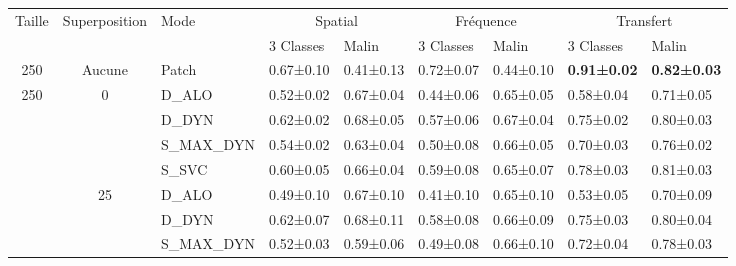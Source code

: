 \begin{landscape}

\begin{table}[H]
    \centering
    \begin{tabular}{cclllllll}
		\toprule
		\multirow{2}{*}{Taille}     & \multirow{2}{*}{Superposition}    & \multirow{2}{*}{Mode}     & \multicolumn{2}{c}{Spatial}       & \multicolumn{2}{c}{Fréquence}     & \multicolumn{2}{c}{Transfert}         \\
		                            &                                   &                           & 3 Classes         & Malin         & 3 Classes         & Malin         & 3 Classes         & Malin             \\ \midrule
		250                         & Aucune                            & Patch                     & 0.67±0.10         & 0.41±0.13     & 0.72±0.07         & 0.44±0.10     & \textbf{0.91±0.02}& \textbf{0.82±0.03}\\ \midrule
		\multirow{12}{*}{250}       & \multirow{4}{*}{0}                & D\_ALO                    & 0.52±0.02         & 0.67±0.04     & 0.44±0.06         & 0.65±0.05     & 0.58±0.04         & 0.71±0.05         \\ 
							        &                                   & D\_DYN                    & 0.62±0.02         & 0.68±0.05     & 0.57±0.06         & 0.67±0.04     & 0.75±0.02         & 0.80±0.03         \\
							        &                                   & S\_MAX\_DYN               & 0.54±0.02         & 0.63±0.04     & 0.50±0.08         & 0.66±0.05     & 0.70±0.03         & 0.76±0.02         \\
							        &                                   & S\_SVC                    & 0.60±0.05         & 0.66±0.04     & 0.59±0.08         & 0.65±0.07     & 0.78±0.03         & 0.81±0.03         \\ \cline{2-9}
							        & \multirow{4}{*}{25}               & D\_ALO                    & 0.49±0.10         & 0.67±0.10     & 0.41±0.10         & 0.65±0.10     & 0.53±0.05         & 0.70±0.09         \\
							        &                                   & D\_DYN                    & 0.62±0.07         & 0.68±0.11     & 0.58±0.08         & 0.66±0.09     & 0.75±0.03         & 0.80±0.04         \\
							        &                                   & S\_MAX\_DYN               & 0.52±0.03         & 0.59±0.06     & 0.49±0.08         & 0.66±0.10     & 0.72±0.04         & 0.78±0.03         \\

\end{tabular}
\end{table}
\end{landscape}
